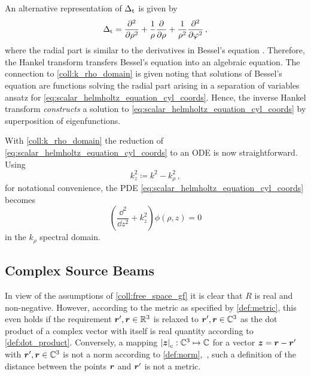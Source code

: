 \begin{remark}
	An alternative representation of $\operatorname{\operatorname{\Delta}_\mathrm{t}}$ is given by
	\cite[(1.5.15)]{Olver2010}
	\begin{equation}
		\operatorname{\operatorname{\Delta}_\mathrm{t}} =
		\frac{\partial^2}{\partial \rho^2} + 
		\frac{1}{\rho}
		\frac{\partial}{\partial \rho} + 
		\frac{1}{\rho^2}
		\frac{\partial^2}{\partial \varphi^2}
		\, ,
	\end{equation}
	where the radial part is similar to the derivatives in Bessel's equation
	\cite[(10.2.1)]{Olver2010}.
	Therefore, the Hankel transform transfers Bessel's equation into an
	algebraic equation.
	The connection to \cref{coll:k_rho_domain} is given noting that 
	solutions of Bessel's equation are functions solving the radial part arising
	in a separation of variables ansatz for
	\eqref{eq:scalar_helmholtz_equation_cyl_coords}.
	Hence, the inverse Hankel transform \emph{constructs} a solution to
	\eqref{eq:scalar_helmholtz_equation_cyl_coords} by superposition of
	eigenfunctions.
\end{remark}

With \cref{coll:k_rho_domain} the reduction of
\eqref{eq:scalar_helmholtz_equation_cyl_coords} to an \ac{ODE} is now
straightforward.
Using
\begin{equation}
	k_z^2 \coloneqq k^2 - k_\rho^2
	\, ,
\end{equation}
for notational convenience, the \ac{PDE}
\eqref{eq:scalar_helmholtz_equation_cyl_coords} becomes
\begin{equation}
	\left( \frac{\dd^2}{\dd z^2} + k_z^2 \right)
	\phi \left(\rho, z\right) = 0
\end{equation}
in the $k_\rho$ spectral domain.







\subsection{Complex Source Beams}

In view of the assumptions of \cref{coll:free_space_gf} it is clear that
$R$ is real and non-negative.
However, according to the metric as specified by \cref{def:metric}, this even
holds if the requirement $\rsrc, \robs \in \R^3$ is relaxed to
$\rsrc, \robs \in \C^3$ as the dot product of a complex vector with itself
is real quantity according to \cref{def:dot_product}.
Conversely, a mapping $\cmplxlength{\pvec{z}}: \C^3 \mapsto \C$ for a vector
$\pvec{z} = \rdiff$ with $\rsrc, \robs \in \C^3$ is not a norm according
to \cref{def:norm},~\ie, such a definition of the distance between the
points $\robs$ and $\rsrc$ is not a metric.

